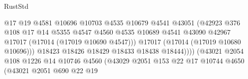 \begin{lexlean}{RustStd}
\begin{coremodule}
                                              @17
                                              @19
                                              @4581
                                              @10696
                                              @10703
                                              @4535
                                              @10679
                                              @4541
                                              @43051
                                              (@42923
                                                @376
                                                @108
                                                @17
                                                @14
                                                @5355
                                                @4547
                                                @4560
                                                @4535
                                                @10689
                                                @4541
                                                @43090
                                                @42967
                                                @17017
                                                (@17014 (@17019 @10690 @4547)))
                                              @17017
                                              (@17014 (@17019 @10680 @10696)))
                                            @18423
                                            @18426
                                            @18429
                                            @18433
                                            @18438
                                            @18444))))
                                    (@43021
                                      @2054
                                      @108
                                      @1226
                                      @14
                                      @10746
                                      @4560
                                      (@43029
                                        @2051
                                        @153
                                        @22
                                        @17
                                        @10744
                                        @4650
                                        (@43021
                                          @2051
                                          @690
                                          @22
                                          @19

\end{coremodule}
\end{lexlean}
